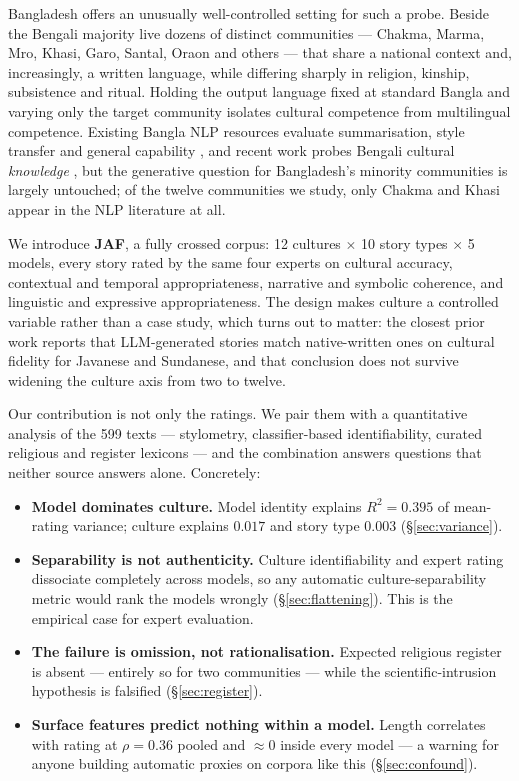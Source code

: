\documentclass[11pt]{article}
\begin{document}
Bangladesh offers an unusually well-controlled setting for such a probe. Beside
the Bengali majority live dozens of distinct communities --- Chakma, Marma,
Mro, Khasi, Garo, Santal, Oraon and others --- that share a national context
and, increasingly, a written language, while differing sharply in religion,
kinship, subsistence and ritual. Holding the output language fixed at standard
Bangla and varying only the target community isolates cultural competence from
multilingual competence. Existing Bangla NLP resources evaluate summarisation,
style transfer and general capability
\cite{bhattacharjee-etal-2023-banglanlg,khan-etal-2023-banglachq,kabir-etal-2024-benllm,mukherjee-etal-2023-low},
and recent work probes Bengali cultural \emph{knowledge}
\cite{chowdhury-etal-2025-facts}, but the generative question for Bangladesh's
minority communities is largely untouched; of the twelve communities we study,
only Chakma \cite{rahman-etal-2025-chakmabridge} and Khasi
\cite{ghosh-etal-2025-towards} appear in the NLP literature at all.

We introduce \textbf{JAF}, a fully crossed corpus: 12 cultures $\times$ 10
story types $\times$ 5 models, every story rated by the same four experts on
cultural accuracy, contextual and temporal appropriateness, narrative and
symbolic coherence, and linguistic and expressive appropriateness. The design
makes culture a controlled variable rather than a case study, which turns out
to matter: the closest prior work \cite{pranida-etal-2025-culturally} reports
that LLM-generated stories match native-written ones on cultural fidelity for
Javanese and Sundanese, and that conclusion does not survive widening the
culture axis from two to twelve.

Our contribution is not only the ratings. We pair them with a quantitative
analysis of the 599 texts --- stylometry, classifier-based identifiability,
curated religious and register lexicons --- and the combination answers
questions that neither source answers alone. Concretely:

\begin{itemize}\itemsep1pt
\item \textbf{Model dominates culture.} Model identity explains $R^2 = 0.395$
of mean-rating variance; culture explains $0.017$ and story type $0.003$
(\S\ref{sec:variance}).
\item \textbf{Separability is not authenticity.} Culture identifiability and
expert rating dissociate completely across models, so any automatic
culture-separability metric would rank the models wrongly
(\S\ref{sec:flattening}). This is the empirical case for expert evaluation.
\item \textbf{The failure is omission, not rationalisation.} Expected
religious register is absent --- entirely so for two communities --- while the
scientific-intrusion hypothesis is falsified (\S\ref{sec:register}).
\item \textbf{Surface features predict nothing within a model.} Length
correlates with rating at $\rho = 0.36$ pooled and $\approx 0$ inside every
model --- a warning for anyone building automatic proxies on corpora like this
(\S\ref{sec:confound}).
\end{itemize}
\end{document}
